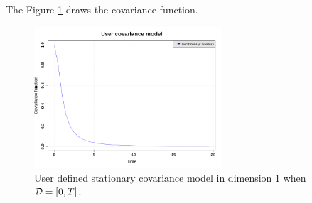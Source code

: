 The Figure \ref{UserDefinedStationaryCovarianceModelDemonstration} draws the covariance function.

\begin{figure}[H]
  \begin{center}
    \includegraphics[width=7cm]{Figures/UserDefinedStationaryCovarianceModelDemonstration.png}
    \caption{User defined stationary covariance model in dimension 1 when ${\mathcal D}=[0,T]$.}
    \label{UserDefinedStationaryCovarianceModelDemonstration}
  \end{center}
\end{figure}
